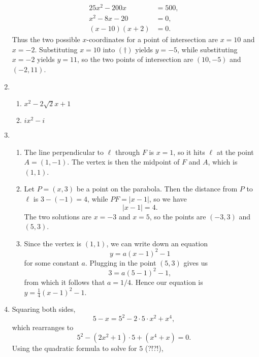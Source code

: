\begin{enumerate}
\begin{align*}
25x^2 - 200x &= 500, \\
x^2 - 8x - 20 &= 0, \\
(x - 10)(x + 2) &= 0.
\end{align*}
Thus the two possible $x$-coordinates for a point of intersection are $x = 10$ and $x = -2$. Substituting $x = 10$ into $(\dagger)$ yields $y = -5$, while substituting $x = -2$ yields $y = 11$, so the two points of intersection are $\boxed{(10, -5)}$ and $\boxed{(-2, 11)}$.
\item \begin{enumerate}
\item $x^2 - 2\sqrt{2}x + 1$
\item $ix^2 - i$
\end{enumerate}
\item \begin{enumerate}
\item The line perpendicular to $\ell$ through $F$ is $x = 1$, so it hits $\ell$ at the point $A = (1,-1)$. The vertex is then the midpoint of $F$ and $A$, which is $\boxed{(1,1)}$.
\item Let $P = (x,3)$ be a point on the parabola. Then the distance from $P$ to $\ell$ is $3 - (-1) = 4$, while $PF = \lvert x - 1\rvert$, so we have
\begin{equation*}
\lvert x - 1\rvert = 4.
\end{equation*}
The two solutions are $x = -3$ and $x = 5$, so the points are $\boxed{(-3,3)}$ and $\boxed{(5,3)}$.
\item Since the vertex is $(1,1)$, we can write down an equation
\begin{equation*}
y = a(x - 1)^2 - 1
\end{equation*}
for some constant $a$. Plugging in the point $(5,3)$ gives us
\begin{equation*}
3 = a(5 - 1)^2 - 1,
\end{equation*}
from which it follows that $a = 1/4$. Hence our equation is $\boxed{y = \frac{1}{4}(x - 1)^2 - 1}$.
\end{enumerate}
\item Squaring both sides,
\begin{equation*}
5 - x = 5^2 - 2\cdot 5\cdot x^2 + x^4,
\end{equation*}
which rearranges to
\begin{equation*}
5^2 - (2x^2 + 1)\cdot 5 + (x^4 + x) = 0.
\end{equation*}
Using the quadratic formula to solve for $5$ (?!?!),
\begin{align*}

\end{align*}
\end{enumerate}
